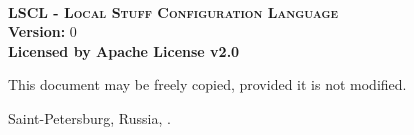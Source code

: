 
\begin{titlepage}
	\begin{center}
		~\\
		\vspace{5cm}
		
		\textsc{\bf \LARGE LSCL - Local Stuff Configuration Language}\\[5mm]
		
		{ \Large
			{\bf Version:} 0 \\[2mm]
			{\bf Licensed by    Apache License v2.0}
		}
		\bigskip
	\end{center}
	
	\vfill
	
	\hfill
	\begin{minipage}{0.4\linewidth}
		This document may be freely copied, provided it is not modified.
	\end{minipage}
	\vfill

	\begin{center}
		Saint-Petersburg, Russia, \the\year .
	\end{center}
\end{titlepage}
